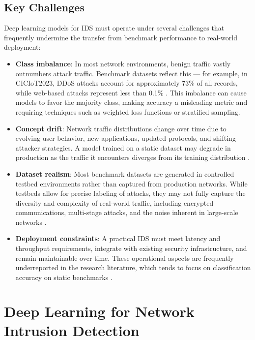 \subsection{Key Challenges}
\label{subsec:ids_challenges}

\par Deep learning models for IDS must operate under several challenges that frequently undermine the transfer from benchmark performance to real-world deployment:

\begin{itemize}
    \item \textbf{Class imbalance}: In most network environments, benign traffic vastly outnumbers attack traffic. Benchmark datasets reflect this --- for example, in CICIoT2023, DDoS attacks account for approximately 73\% of all records, while web-based attacks represent less than 0.1\% \cite{CICIoT2023}. This imbalance can cause models to favor the majority class, making accuracy a misleading metric and requiring techniques such as weighted loss functions or stratified sampling.
    \item \textbf{Concept drift}: Network traffic distributions change over time due to evolving user behavior, new applications, updated protocols, and shifting attacker strategies. A model trained on a static dataset may degrade in production as the traffic it encounters diverges from its training distribution \cite{Andresini2024}.
    \item \textbf{Dataset realism}: Most benchmark datasets are generated in controlled testbed environments rather than captured from production networks. While testbeds allow for precise labeling of attacks, they may not fully capture the diversity and complexity of real-world traffic, including encrypted communications, multi-stage attacks, and the noise inherent in large-scale networks \cite{Lansky2021}.
    \item \textbf{Deployment constraints}: A practical IDS must meet latency and throughput requirements, integrate with existing security infrastructure, and remain maintainable over time. These operational aspects are frequently underreported in the research literature, which tends to focus on classification accuracy on static benchmarks \cite{Zhang2025}.
\end{itemize}


\section{Deep Learning for Network Intrusion Detection}
\label{sec:dl_ids}

